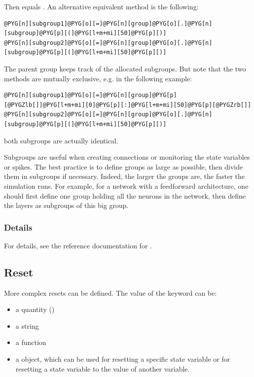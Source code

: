\documentclass[letterpaper,10pt,english]{manual}
\begin{document}
Then  equals .
An alternative equivalent method is the following:

\begin{Verbatim}[commandchars=@\[\]]
@PYG[n][subgroup1]@PYG[o][=]@PYG[n][group]@PYG[o][.]@PYG[n][subgroup]@PYG[p][(]@PYG[l+m+mi][50]@PYG[p][)]
@PYG[n][subgroup2]@PYG[o][=]@PYG[n][group]@PYG[o][.]@PYG[n][subgroup]@PYG[p][(]@PYG[l+m+mi][50]@PYG[p][)]
\end{Verbatim}

The parent group keeps track of the allocated subgroups. But note that the two methods are
mutually exclusive, e.g. in the following example:

\begin{Verbatim}[commandchars=@\[\]]
@PYG[n][subgroup1]@PYG[o][=]@PYG[n][group]@PYG[p][@PYGZlb[]]@PYG[l+m+mi][0]@PYG[p][:]@PYG[l+m+mi][50]@PYG[p][@PYGZrb[]]
@PYG[n][subgroup2]@PYG[o][=]@PYG[n][group]@PYG[o][.]@PYG[n][subgroup]@PYG[p][(]@PYG[l+m+mi][50]@PYG[p][)]
\end{Verbatim}

both subgroups are actually identical.

Subgroups are useful when creating connections or monitoring the state variables or spikes.
The best practice is to define groups as large as possible, then divide them in subgroups if necessary.
Indeed, the larger the groups are, the faster the simulation runs. For example, for a network with a feedforward
architecture, one should first define one group holding all the neurons in the network, then define the layers as
subgroups of this big group.


\subsubsection{Details}

For details, see the reference documentation for \hyperlink{brian.NeuronGroup}{}.


\subsection{Reset}

More complex resets can be defined. The value of the  keyword can be:
\begin{itemize}
\item {} 
a quantity ()

\item {} 
a string

\item {} 
a function

\item {} 
a \hyperlink{brian.Reset}{} object, which can be used for resetting a specific state variable or
for resetting a state variable to the value of another variable.

\end{itemize}
\end{document}
